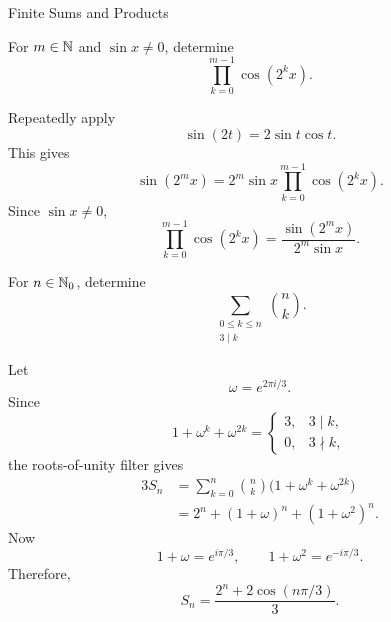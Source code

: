 \begin{expectedproblemgroup}{Finite Sums and Products}
        \begin{expectedsubproblem}
            For $m\in\mathbb{N}$ and $\sin x\neq0$, determine
            \[
                \prod_{k=0}^{m-1}\cos(2^k x).
            \]
        \end{expectedsubproblem}

        \begin{expectedsubsolution}
            Repeatedly apply
            \[
                \sin(2t)=2\sin t\cos t.
            \]
            This gives
            \[
                \sin(2^m x)
                =
                2^m\sin x
                \prod_{k=0}^{m-1}\cos(2^k x).
            \]
            Since $\sin x\neq0$,
            \[
                \boxed{
                    \prod_{k=0}^{m-1}\cos(2^k x)
                    =
                    \frac{\sin(2^m x)}{2^m\sin x}
                }.
            \]
        \end{expectedsubsolution}

        \begin{expectedsubproblem}
            For $n\in\mathbb{N}_0$, determine
            \[
                \sum_{\substack{0\leq k\leq n\\3\mid k}}
                \binom{n}{k}.
            \]
        \end{expectedsubproblem}

        \begin{expectedsubsolution}
            Let
            \[
                \omega=e^{2\pi i/3}.
            \]
            Since
            \[
                1+\omega^k+\omega^{2k}
                =
                \begin{cases}
                    3, & 3\mid k,\\
                    0, & 3\nmid k,
                \end{cases}
            \]
            the roots-of-unity filter gives
            \[
                \begin{aligned}
                    3S_n
                    &=
                    \sum_{k=0}^{n}\binom{n}{k}
                    \bigl(1+\omega^k+\omega^{2k}\bigr)\\
                    &=
                    2^n+(1+\omega)^n+(1+\omega^2)^n.
                \end{aligned}
            \]
            Now
            \[
                1+\omega=e^{i\pi/3},
                \qquad
                1+\omega^2=e^{-i\pi/3}.
            \]
            Therefore,
            \[
                \boxed{
                    S_n
                    =
                    \frac{2^n+2\cos(n\pi/3)}{3}
                }.
            \]
        \end{expectedsubsolution}


\end{expectedproblemgroup}
